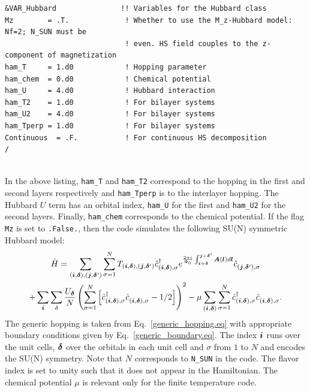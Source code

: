 \begin{lstlisting}[style=fortran,escapechar=\#,breaklines=true]
&VAR_Hubbard               !! Variables for the Hubbard class
Mz        = .T.             ! Whether to use the M_z-Hubbard model: Nf=2; N_SUN must be  
                            ! even. HS field couples to the z-component of magnetization
ham_T     = 1.d0            ! Hopping parameter
ham_chem  = 0.d0            ! Chemical potential
ham_U     = 4.d0            ! Hubbard interaction
ham_T2    = 1.d0            ! For bilayer systems
ham_U2    = 4.d0            ! For bilayer systems
ham_Tperp = 1.d0            ! For bilayer systems
Continuous  = .F.           ! For continuous HS decomposition
/
               
\end{lstlisting}
In the above listing, \texttt{ham\_T} and \texttt{ham\_T2} correspond to the hopping in the first and second layers respectively and  \texttt{ham\_Tperp} is to the interlayer hopping.   The Hubbard $U$ term has an orbital index, \texttt{ham\_U}  for the first and \texttt{ham\_U2} for the second layers.  Finally,  \texttt{ham\_chem}  corresponds to the chemical potential.    If the flag \texttt{Mz} is set to \texttt{.False.}, then the code simulates the following SU(N) symmetric Hubbard model:
\begin{multline}
\hat{H} = \sum_{(\ve{i},\ve{\delta}), (\ve{j},\ve{\delta}')}  \sum_{\sigma =1}^{N}  T_{(\ve{i},\ve{\delta}), (\ve{j},\ve{\delta}')}    \hat{c}^{\dagger}_{(\ve{i},\ve{\delta}), \sigma }   e^{\frac{2 \pi i}{\Phi_0} \int_{\ve{i} + \ve{\delta}}^{\ve{j} + \ve{\delta}'}  
     \vec{A}(\ve{l})  d \ve{l}} \hat{c}^{}_{(\ve{j},\ve{\delta}'),\sigma} \\
 + \sum_{\vec{i}} \sum_{\delta}   \frac{U_{\ve{\delta}} }{N} \left(\sum_{\sigma=1}^{N}  \left[   \hat{c}^{\dagger}_{(\vec{i},\ve{\delta}),\sigma } 
    \hat{c}^{\phantom\dagger}_{(\vec{i}, \ve{\delta}),\sigma }  - 1/2  \right] \right)^2
    - \mu \sum_{(\ve{i},\ve{\delta})}  \sum_{\sigma =1}^{N} \hat{c}^{\dagger}_{(\vec{i},\ve{\delta}),\sigma } \hat{c}^{\phantom\dagger}_{(\vec{i},\ve{\delta}),\sigma } .
\end{multline}
The generic hopping is taken from Eq.~\eqref{generic_hopping.eq}   with appropriate boundary conditions given by Eq.~\eqref{generic_boundary.eq}.  The index $\boldsymbol{i}$ runs over the unit cells, $\boldsymbol{\delta}$ over the orbitals in each unit cell and $\sigma$  from $1$ to $N$  and encodes the SU(N) symmetry.    Note that  $N$ corresponds to \texttt{N\_SUN}  in the code.  The flavor index is set to  unity such that it does not appear in the  Hamiltonian. The chemical potential $\mu$ is relevant only for the finite temperature code. 

